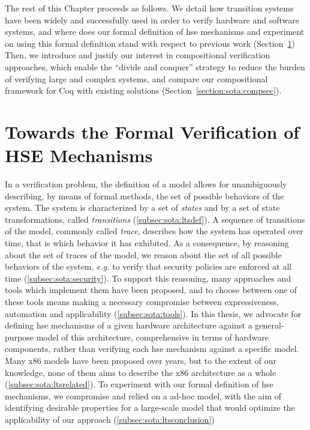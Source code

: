 The rest of this Chapter proceeds as follows.
%
We detail how transition systems have been widely and successfully used in order
to verify hardware and software systems, and where does our formal definition of
\ac{hse} mechanisms and experiment on using this formal definition stand with
respect to previous work (Section~\ref{sec:sota:formalisms})
%
Then, we introduce and justify our interest in compositional verification
approaches, which enable the ``divide and conquer'' strategy to reduce the
burden of verifying large and complex systems, and compare our compositional
framework for Coq with existing solutions (Section~\ref{section:sota:compsec}).

\section{Towards the Formal Verification of HSE Mechanisms}
\label{sec:sota:formalisms}

In a verification problem, the definition of a model allows for unambiguously
describing, by means of formal methods, the set of possible behaviors of the
system.
%
The system is characterized by a set of \emph{states} and by a set of state
transformations, called \emph{transitions} (\ref{subsec:sota:ltsdef}).
%
A sequence of transitions of the model, commonly called \emph{trace}, describes
how the system has operated over time, that is which behavior it has exhibited.
%
As a consequence, by reasoning about the set of traces of the model, we reason
about the set of all possible behaviors of the system, \emph{e.g.} to verify
that security policies are enforced at all time (\ref{subsec:sota:security}).
%
To support this reasoning, many approaches and tools which implement them have
been proposed, and to choose between one of these tools means making a necessary
compromise between expressiveness, automation and applicability
(\ref{subsec:sota:tools}).
%
In this thesis, we advocate for defining \ac{hse} mechanisms of a given hardware
architecture against a general-purpose model of this architecture, comprehensive
in terms of hardware components, rather than verifying each \ac{hse} mechanism
against a specific model.
%
Many x86 models have been proposed over years, but to the extent of our
knowledge, none of them aims to describe the x86 architecture as a whole
(\ref{subsec:sota:ltsrelated}).
%
To experiment with our formal definition of \ac{hse} mechanisms, we compromise
and relied on a ad-hoc model, with the aim of identifying desirable properties
for a large-scale model that would optimize the applicability of our approach
(\ref{subsec:sota:ltsconclusion})

